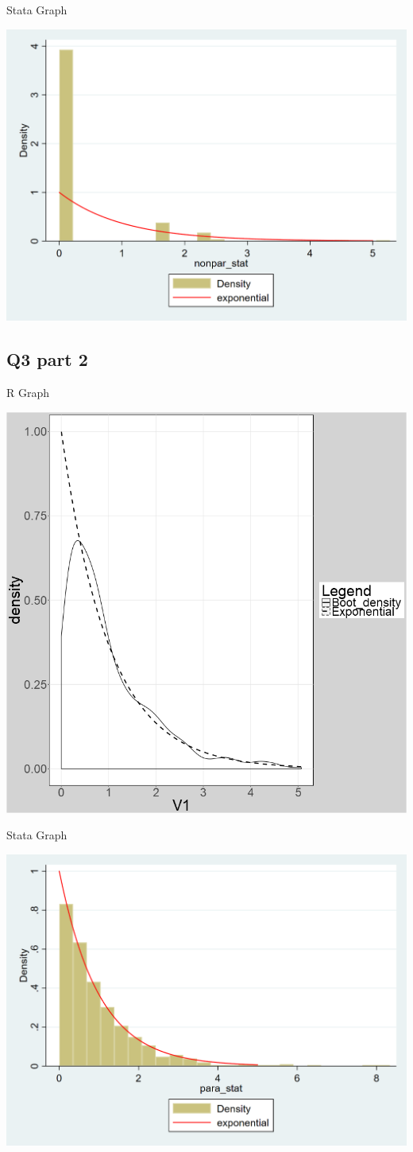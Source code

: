 \documentclass[11pt]{article}
\begin{document}
\centerline{Stata Graph }
\begin{center}
	\includegraphics[width=.8\linewidth]{stata_plot_q3_1.png}	
\end{center}

\subsection{Q3 part 2}
\centerline{R Graph }
\begin{center}
	\includegraphics[width=.8\linewidth]{plot_q3_2.png}	
\end{center}

\centerline{Stata Graph }
\begin{center}
	\includegraphics[width=.8\linewidth]{stata_plot_q3_2.png}	
\end{center}
\end{document}
